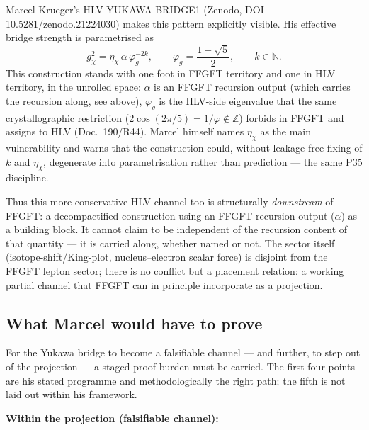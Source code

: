 Marcel Krueger's HLV-YUKAWA-BRIDGE1 (Zenodo, DOI 10.5281/zenodo.21224030)
makes this pattern explicitly visible. His effective bridge strength is
parametrised as
\begin{equation}
  g_\chi^2 = \eta_\chi\,\alpha\,\varphi_g^{-2k}, \qquad
  \varphi_g = \frac{1+\sqrt5}{2}, \qquad k \in \mathbb{N}.
\end{equation}
This construction stands with one foot in FFGFT territory and one in HLV
territory, in the unrolled space: $\alpha$ is an FFGFT recursion output (which
carries the recursion along, see above), $\varphi_g$ is the HLV-side eigenvalue
that the same crystallographic restriction ($2\cos(2\pi/5) = 1/\varphi \notin
\mathbb{Z}$) forbids in FFGFT and assigns to HLV (Doc.~190/R44). Marcel himself
names $\eta_\chi$ as the main vulnerability and warns that the construction
could, without leakage-free fixing of $k$ and $\eta_\chi$, degenerate into
parametrisation rather than prediction --- the same P35 discipline.

Thus this more conservative HLV channel too is structurally \emph{downstream}
of FFGFT: a decompactified construction using an FFGFT recursion output
($\alpha$) as a building block. It cannot claim to be independent of the
recursion content of that quantity --- it is carried along, whether named or
not. The sector itself (isotope-shift/King-plot, nucleus--electron scalar
force) is disjoint from the FFGFT lepton sector; there is no conflict but a
placement relation: a working partial channel that FFGFT can in principle
incorporate as a projection.

\subsection*{What Marcel would have to prove}

For the Yukawa bridge to become a falsifiable channel --- and further, to step
out of the projection --- a staged proof burden must be carried. The first four
points are his stated programme and methodologically the right path; the fifth
is not laid out within his framework.

\textbf{Within the projection (falsifiable channel):}

